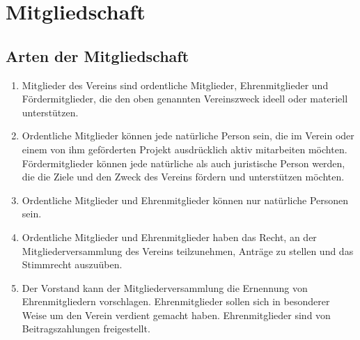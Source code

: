 \documentclass[12pt,a4paper,draft]{article}
\begin{document}
\section{Mitgliedschaft}
\subsection{Arten der Mitgliedschaft}
\begin{enumerate}
\item Mitglieder des Vereins sind ordentliche Mitglieder, Ehrenmitglieder und 
Fördermitglieder, die den oben genannten Vereinszweck ideell oder materiell 
unterstützen.

\item Ordentliche Mitglieder können jede natürliche Person sein,  die im Verein oder einem von
ihm geförderten Projekt ausdrücklich aktiv mitarbeiten möchten. Fördermitglieder können jede natürliche
als auch juristische Person werden, die die Ziele und den
Zweck des Vereins fördern und unterstützen möchten.

\item Ordentliche Mitglieder und Ehrenmitglieder können nur natürliche Personen 
sein.

\item Ordentliche Mitglieder und Ehrenmitglieder haben das Recht, an der 
Mitgliederversammlung des Vereins teilzunehmen, Anträge zu stellen und das 
Stimmrecht auszuüben.

\item Der Vorstand kann der Mitgliederversammlung die Ernennung von 
Ehrenmitgliedern vorschlagen.  Ehrenmitglieder sollen sich in besonderer Weise um den Verein verdient gemacht haben. Ehrenmitglieder sind von Beitragszahlungen 
freigestellt. 
\end{enumerate}
\end{document}
